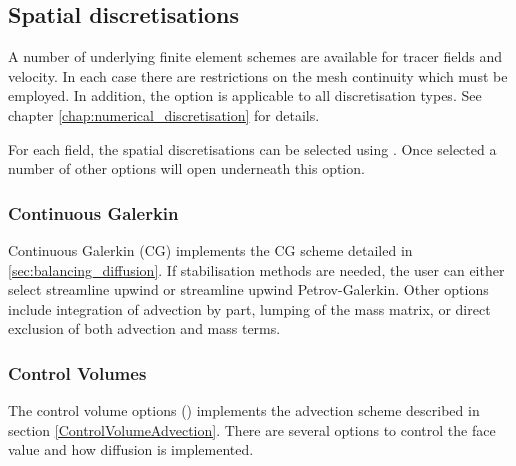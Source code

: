 \subsection{Spatial discretisations}\label{sec:Spatial discretisations}

A number of underlying finite element schemes are available for tracer
fields and velocity. In each case there are restrictions on the mesh
continuity which must be employed. In addition, the \onlypdf\linebreak
{} option is applicable to all discretisation
types. See chapter \ref{chap:numerical_discretisation} for details.

For each field, the spatial discretisations can be selected using
.  Once selected a number
of other options will open underneath this option.

\subsubsection{Continuous Galerkin}
\label{sec:configuring_fluidity_continuous_galerkin}

Continuous Galerkin (CG) implements the CG scheme detailed in \ref{sec:balancing_diffusion}. If stabilisation methods are needed, the user can either select streamline upwind or streamline upwind Petrov-Galerkin. Other options include integration of advection by part, lumping of the mass matrix, or direct exclusion of both advection and mass terms.

\subsubsection{Control Volumes}\label{sec:CVs}

The control volume options () implements the advection scheme described in section \ref{ControlVolumeAdvection}. There are
several options to control the face value and how diffusion is implemented.

